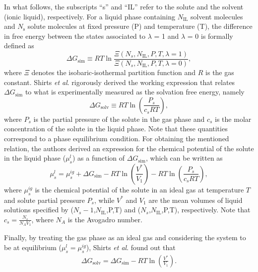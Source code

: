 \documentclass[3p,twocolumn]{elsarticle}
\begin{document}
In what follows, the subscripts ``s'' and ``IL'' refer to the solute and the solvent (ionic liquid), respectively.
For a liquid phase containing $N_\text{IL}$ solvent molecules and $N_{\text{s}}$ solute molecules at fixed pressure (P) and temperature (T), the difference in free energy between the states associated to $\lambda$ = 1 and $\lambda$ = 0 is formally defined as
\begin{equation}
\Delta G_\text{sim} \equiv R T \ln \frac{\Xi (N_s,N_\text{IL},P,T,\lambda = 1)}{\Xi (N_s,N_\text{IL},P,T,\lambda = 0)}, 
\end{equation}
where $\Xi$ denotes the isobaric-isothermal partition function and $R$ is the gas constant.
Shirts \textit{et al}. \cite{Shirts_2003} rigorously derived the working expression that relates $\Delta G_\text{sim}$ to what is experimentally measured as the solvation free energy, namely
\begin{equation}
\label{eq:solvation free energy definition}
\Delta G_{\text{solv}} \equiv R T \ln \left( \frac{P_s}{c_s R T} \right),
\end{equation}
where $P_s$ is the partial pressure of the solute in the gas phase and
$c_s$ is the molar concentration of the solute in the liquid phase.
Note that these quantities correspond to a phase equilibrium condition.
For obtaining the mentioned relation, the authors derived an expression for the chemical potential of the solute in the liquid phase ($\mu^l_s$) as a function of $\Delta G_\text{sim}$, which can be written as
\begin{equation}
\label{eq:solute chemical potential}
\mu^l_s = \mu^{ig}_s + \Delta G_\text{sim} - RT \ln \left( \frac{V^{\ast}}{V_1}\right) - RT \ln \left( \frac{P_s}{c_s R T} \right),
\end{equation}
where $\mu^{ig}_s$ is the chemical potential of the solute in an ideal gas at temperature $T$ and solute partial pressure $P_s$, while $V^{\ast}$ and $V_1$ are the mean volumes of liquid solutions specified by ($N_s-1$,$N_\text{IL}$,P,T) and ($N_s$,$N_\text{IL}$,P,T), respectively.
Note that $c_s = \frac{N_s}{N_A V_1}$, where $N_A$ is the Avogadro number.

Finally, by treating the gas phase as an ideal gas and considering the system to be at equilibrium ($\mu^l_s = \mu^{ig}_s$), Shirts \textit{et al}. \cite{Shirts_2003} found out that
\begin{equation}
\begin{split}
\label{eq:free_solv}
 \Delta G_{\text{solv}} = \Delta G_\text{sim} - RT \ln \left( \frac{V^{\ast}}{V_1}\right).
\end{split}
\end{equation}
\end{document}
